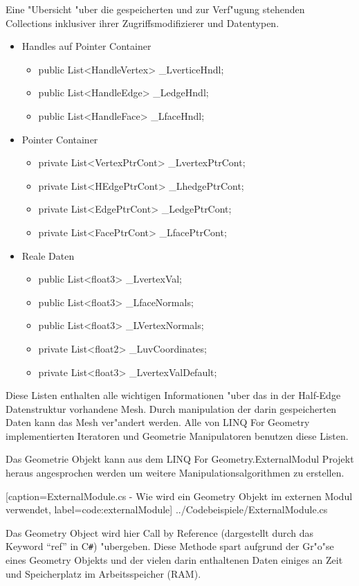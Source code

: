 \documentclass[pagesize, paper=a4, fontsize=12pt,titlepage=true, headings=small, headnosepline, abstractoff, liststotoc, nochapterprefix, plainheadsepline]{scrreprt}
\newcommand{\CS}{C\texttt{\#}}
\newcommand{\LFG}{LINQ For Geometry}
\newcommand{\LFGS}{LINQ For Geometry }
\newcommand{\HES}{Half-Edge Datenstruktur }
\begin{document}
Eine "Ubersicht "uber die gespeicherten und zur Verf"ugung stehenden Collections inklusiver ihrer Zugriffsmodifizierer und Datentypen.
\begin{itemize}
\item Handles auf Pointer Container
	\begin{itemize}
    \item public List<HandleVertex> \_LverticeHndl;
    \item public List<HandleEdge> \_LedgeHndl;
	\item public List<HandleFace> \_LfaceHndl;
	\end{itemize}
\item Pointer Container
	\begin{itemize}
	\item private List<VertexPtrCont> \_LvertexPtrCont;
	\item private List<HEdgePtrCont> \_LhedgePtrCont;
	\item private List<EdgePtrCont> \_LedgePtrCont;
	\item private List<FacePtrCont> \_LfacePtrCont;
	\end{itemize}
\item Reale Daten
	\begin{itemize}
	\item public List<float3> \_LvertexVal;
	\item public List<float3> \_LfaceNormals;
	\item public List<float3> \_LVertexNormals;
	\item private List<float2> \_LuvCoordinates;
	\item private List<float3> \_LvertexValDefault;
	\end{itemize}
\end{itemize}
Diese Listen enthalten alle wichtigen Informationen "uber das in der \HES vorhandene Mesh. Durch manipulation der darin gespeicherten Daten kann das Mesh ver"andert werden. Alle von \LFGS implementierten Iteratoren und Geometrie Manipulatoren benutzen diese Listen.

Das Geometrie Objekt kann aus dem \LFG.ExternalModul Projekt heraus angesprochen werden um weitere Manipulationsalgorithmen zu erstellen.

			[caption={ExternalModule.cs - Wie wird ein Geometry Objekt im externen Modul verwendet}, label=code:externalModule]
			{../Codebeispiele/ExternalModule.cs}

Das Geometry Object wird hier Call by Reference (dargestellt durch das Keyword "`ref"' in \CS) "ubergeben. Diese Methode spart aufgrund der Gr"o"se eines Geometry Objekts und der vielen darin enthaltenen Daten einiges an Zeit und Speicherplatz im Arbeitsspeicher (RAM).
\end{document}
